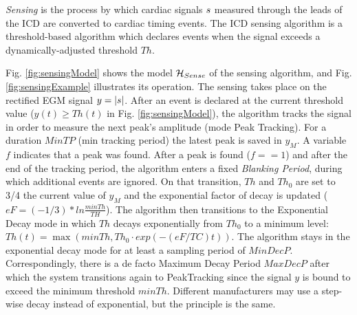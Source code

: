 \emph{Sensing} is the process by which cardiac signals $s$ measured through the leads of the \ac{ICD} are converted to cardiac timing events.
The \ac{ICD} sensing algorithm is a threshold-based algorithm which declares events when the signal exceeds a dynamically-adjusted threshold $Th$.

Fig. \ref{fig:sensingModel} shows the model $\mathcal{H}_{Sense}$ of the sensing algorithm, and Fig. \ref{fig:sensingExample} illustrates its operation. 
The sensing takes place on the rectified \ac{EGM} signal $y = |s|$.
After an event is declared at the current threshold value ($y(t)\geq Th(t)$ in Fig. \ref{fig:sensingModel}), the algorithm tracks the signal in order to measure the next peak's amplitude (mode Peak Tracking).
For a duration $MinTP$ (min tracking period) the latest peak is saved in $y_M$.
A variable $f$ indicates that a peak was found.
After a peak is found ($f==1$) and after the end of the tracking period, the algorithm enters a fixed \emph{Blanking Period}, during which additional events are ignored.
On that transition, $Th$ and $Th_0$ are set to 3/4 the current value of $y_{M}$ and the exponential factor of decay is updated ($eF=(-1/3)*ln{\frac{minTh}{TH}}$). 
The algorithm then transitions to the Exponential Decay mode in which $Th$ decays exponentially from $Th_0$ to a minimum level:
$Th(t) = \max(minTh, Th_0\cdot exp(-(eF/TC)t)) $.
The algorithm stays in the exponential decay mode for at least a sampling period of $MinDecP$.
Correspondingly, there is a de facto Maximum Decay Period $MaxDecP$ after which the system transitions again to PeakTracking since the signal $y$ is bound to exceed the minimum threshold $minTh$.
Different manufacturers may use a step-wise decay instead of exponential, but the principle is the same.

